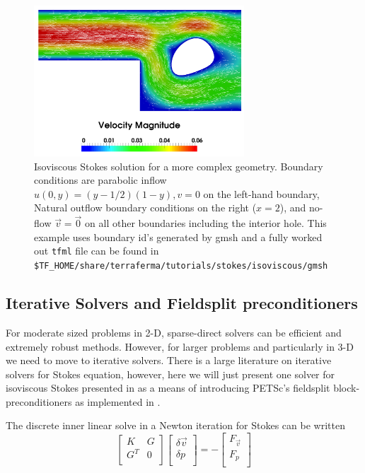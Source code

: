 \begin{figure}[htbp!]
  \centering
  \includegraphics[width=0.7\textwidth]{figures/stokes_gmsh.png}
  \caption{\small Isoviscous Stokes solution for a more complex geometry.
    Boundary conditions are parabolic inflow $u(0,y)=(y-1/2)(1-y),
    v=0$ on the left-hand boundary, Natural outflow boundary
    conditions on the right ($x=2$), and no-flow $\vec{v}=\vec{0}$ on
    all other boundaries including the interior hole.  This example
    uses boundary id's generated by gmsh and a fully worked out
    \texttt{tfml} file can be found in \texttt{\$TF\_HOME/share/terraferma/tutorials/stokes/isoviscous/gmsh}}
  \label{fig:stokes_gmsh}
\end{figure}

\subsection{Iterative Solvers and Fieldsplit preconditioners}
\label{sec:iterative-solvers-1}

For moderate sized problems in 2-D, sparse-direct solvers can be
efficient and extremely robust methods.  However, for larger problems
and particularly in 3-D we need to move to iterative solvers.  There
is a large literature on iterative solvers for Stokes equation, 
however, here we will just present one solver for isoviscous
Stokes presented in \cite{elman_finite_2005} as a means of introducing
PETSc's fieldsplit block-preconditioners as implemented in \TF{}.

The discrete inner linear solve in a Newton iteration for Stokes can
be written
\begin{equation}
  \label{eq:21}
     \left[
\begin{array}{cc}
  K & G  \\
  G^{T} & 0 \\
  \end{array}
  \right]
  \left[
    \begin{array}{c}
      \delta \vec{v} \\
      \delta p \\
    \end{array}
  \right] = -\left[
    \begin{array}{c}
      F_{\vec{v}} \\
      F_{p}\\
    \end{array}
  \right]
\end{equation}

